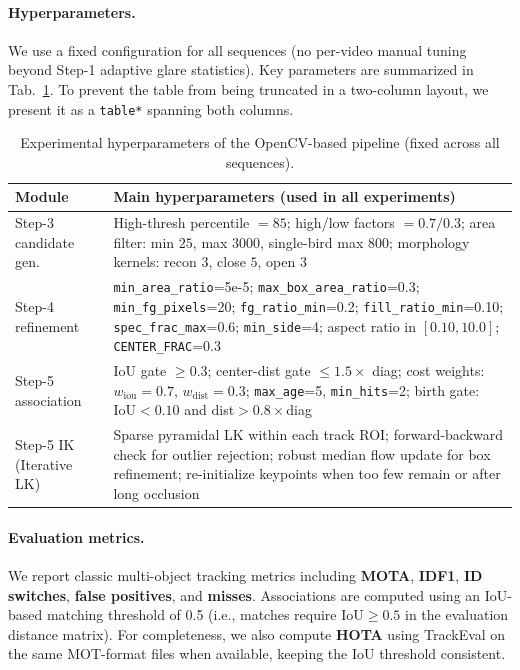\paragraph{Hyperparameters.}
We use a fixed configuration for all sequences (no per-video manual tuning beyond Step-1 adaptive glare statistics).
Key parameters are summarized in Tab.~\ref{tab:opencv_settings}.
To prevent the table from being truncated in a two-column layout, we present it as a \texttt{table*} spanning both columns.

\begin{table}[t]
\centering
\small
\setlength{\tabcolsep}{4pt}
\renewcommand{\arraystretch}{1.05}
\begin{tabular}{p{}|p{}}
\hline
\textbf{Module} & \textbf{Main hyperparameters (used in all experiments)}\\
\hline
Step-3 candidate gen. &
High-thresh percentile $=85$; high/low factors $=0.7/0.3$;
area filter: min $25$, max $3000$, single-bird max $800$;
morphology kernels: recon $3$, close $5$, open $3$ \\
\hline
Step-4 refinement &
\texttt{min\_area\_ratio}=5e{-}5; \texttt{max\_box\_area\_ratio}=0.3; \texttt{min\_fg\_pixels}=20;
\texttt{fg\_ratio\_min}=0.2; \texttt{fill\_ratio\_min}=0.10; \texttt{spec\_frac\_max}=0.6;
\texttt{min\_side}=4; aspect ratio in $[0.10,10.0]$; \texttt{CENTER\_FRAC}=0.3 \\
\hline
Step-5 association &
IoU gate $\ge 0.3$; center-dist gate $\le 1.5 \times$ diag;
cost weights: $w_\text{iou}=0.7$, $w_\text{dist}=0.3$;
\texttt{max\_age}=5, \texttt{min\_hits}=2;
birth gate: IoU$<0.10$ and dist$>0.8\times$diag \\
\hline
Step-5 IK (Iterative LK) &
Sparse pyramidal LK within each track ROI;
forward-backward check for outlier rejection;
robust median flow update for box refinement;
re-initialize keypoints when too few remain or after long occlusion \\
\hline
\end{tabular}
\caption{Experimental hyperparameters of the OpenCV-based pipeline (fixed across all sequences).}
\label{tab:opencv_settings}
\end{table}

\paragraph{Evaluation metrics.}
We report classic multi-object tracking metrics including \textbf{MOTA}, \textbf{IDF1}, \textbf{ID switches}, \textbf{false positives}, and \textbf{misses}.
Associations are computed using an IoU-based matching threshold of 0.5 (i.e., matches require IoU$\ge 0.5$ in the evaluation distance matrix).
For completeness, we also compute \textbf{HOTA} using TrackEval on the same MOT-format files when available, keeping the IoU threshold consistent.



